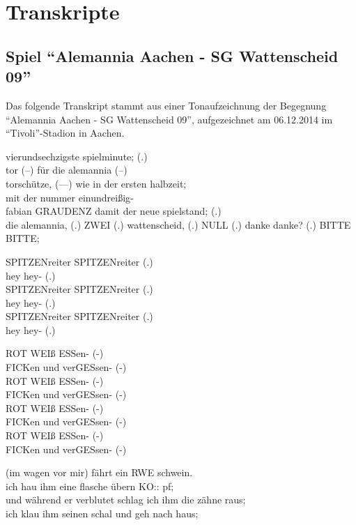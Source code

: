 \section{Transkripte}
\subsection{Spiel "`Alemannia Aachen - SG Wattenscheid 09"'}
Das folgende Transkript stammt aus einer Tonaufzeichnung der Begegnung "`Alemannia Aachen - SG Wattenscheid 09"', aufgezeichnet am 06.12.2014 im "`Tivoli"'-Stadion in Aachen.

\begin{dialogue}
	 vierundsechzigste spielminute; (.) \\
	tor (--) für die alemannia (--) \\
	torschütze, (---) wie in der ersten halbzeit; \\
	mit der nummer einundreißig- \\
	fabian
	 GRAUDENZ
	 damit der neue spielstand; (.) \\
	die alemannia, (.)
	 ZWEI (.)
	 wattenscheid, (.)
	 NULL (.)
	 danke danke? (.)
	 BITTE BITTE;
	
	\bigskip
	
	 SPITZENreiter SPITZENreiter (.) \\
	hey hey- (.) \\
	SPITZENreiter SPITZENreiter (.) \\
	hey hey- (.) \\
	SPITZENreiter SPITZENreiter (.) \\
	hey hey- (.)
	
	\bigskip
	
	 ROT WEIß ESSen- (-) \\
	FICKen und verGESsen- (-) \\
	ROT WEIß ESSen- (-) \\
	FICKen und verGESsen- (-) \\
	ROT WEIß ESSen- (-) \\
	FICKen und verGESsen- (-) \\
	ROT WEIß ESSen- (-) \\
	FICKen und verGESsen- (-)

	\bigskip
	
	 (im wagen vor mir) fährt ein RWE schwein. \\
	ich hau ihm eine flasche übern KO:: pf; \\
	und während er verblutet schlag ich ihm die zähne raus; \\
	ich klau ihm seinen schal und geh nach haus;
\end{dialogue}


